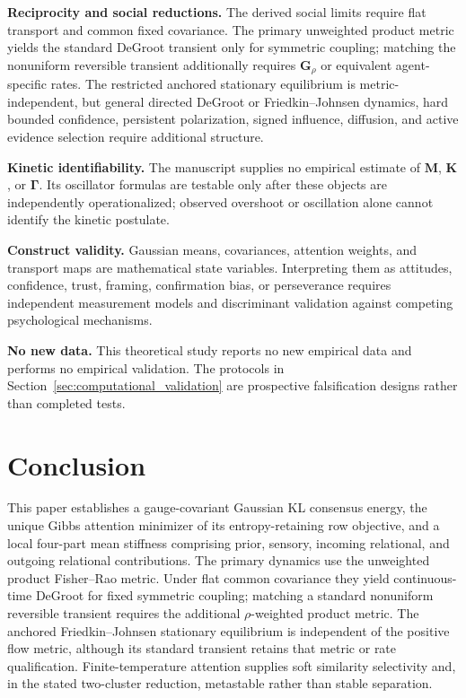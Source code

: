 \documentclass[12pt]{article}
\begin{document}
\textbf{Reciprocity and social reductions.} The derived social limits require flat transport and common fixed covariance. The primary unweighted product metric yields the standard DeGroot transient only for symmetric coupling; matching the nonuniform reversible transient additionally requires $\mathbf G_\rho$ or equivalent agent-specific rates. The restricted anchored stationary equilibrium is metric-independent, but general directed DeGroot or Friedkin--Johnsen dynamics, hard bounded confidence, persistent polarization, signed influence, diffusion, and active evidence selection require additional structure.

\textbf{Kinetic identifiability.} The manuscript supplies no empirical estimate of $\mathbf M$, $\mathbf K$, or $\boldsymbol\Gamma$. Its oscillator formulas are testable only after these objects are independently operationalized; observed overshoot or oscillation alone cannot identify the kinetic postulate.

\textbf{Construct validity.} Gaussian means, covariances, attention weights, and transport maps are mathematical state variables. Interpreting them as attitudes, confidence, trust, framing, confirmation bias, or perseverance requires independent measurement models and discriminant validation against competing psychological mechanisms.

\textbf{No new data.} This theoretical study reports no new empirical data and performs no empirical validation. The protocols in Section~\ref{sec:computational_validation} are prospective falsification designs rather than completed tests.



\section{Conclusion}

This paper establishes a gauge-covariant Gaussian KL consensus energy, the unique Gibbs attention minimizer of its entropy-retaining row objective, and a local four-part mean stiffness comprising prior, sensory, incoming relational, and outgoing relational contributions. The primary dynamics use the unweighted product Fisher--Rao metric. Under flat common covariance they yield continuous-time DeGroot for fixed symmetric coupling; matching a standard nonuniform reversible transient requires the additional $\rho$-weighted product metric. The anchored Friedkin--Johnsen stationary equilibrium is independent of the positive flow metric, although its standard transient retains that metric or rate qualification. Finite-temperature attention supplies soft similarity selectivity and, in the stated two-cluster reduction, metastable rather than stable separation.
\end{document}

